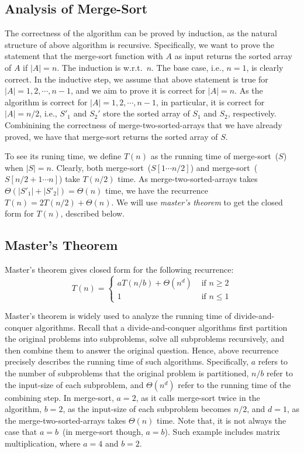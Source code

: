 \subsection*{Analysis of Merge-Sort}

The correctness of the algorithm can be proved by induction, as the natural structure of above algorithm is recursive.
Specifically, we want to prove the statement that the merge-sort function with $A$ as input returns the sorted array of $A$ if $|A| = n$.
The induction is w.r.t.\ $n$. The base case, i.e., $n = 1$, is clearly correct.
In the inductive step, we assume that above statement is true for $|A| = 1, 2, \cdots, n - 1$, and we aim to prove it is correct for $|A| = n$.
As the algorithm is correct for $|A| = 1, 2, \cdots, n - 1$, in particular, it is correct for $|A| = n/2$, i.e.,
$S'_1$ and $S_2'$ store the sorted array of $S_1$ and $S_2$, respectively.
Combinining the correctness of merge-two-sorted-arrays that we have already proved,
we have that merge-sort returns the sorted array of $S$.

To see its runing time, we define $T(n)$ as the running time of merge-sort~($S$) when $|S| = n$.
Clearly, both merge-sort~($S[1\cdots n/2]$) and
merge-sort~($S[n/2+1\cdots n]$) take $T(n/2)$ time.
As merge-two-sorted-arrays takes $\Theta(|S'_1| + |S'_2|) = \Theta(n)$ time, we have the recurrence $T(n) = 2T(n/2) + \Theta(n)$.
We will use \emph{master's theorem} to get the closed form for $T(n)$, described below.

\subsection*{Master's Theorem}

Master's theorem gives closed form for the following recurrence:
\begin{displaymath}
T(n) = \left\{
\begin{array}{llll}
aT(n/b) + \Theta(n^d)  & \textrm{ if } n \ge 2 \\
1  & \textrm{ if } n \le 1 
\end{array}
\right.
\end{displaymath}

Master's theorem is widely used to analyze the running time of divide-and-conquer algorithms. 
Recall that a divide-and-conquer algorithms
first partition the original problems into subproblems, solve all subproblems recursively,
and then combine them to answer the original question.
Hence, above recurrence precisely describes the running time of such algorithms.
Specifically, $a$ refers to the number of subproblems that the original problem is partitioned,
$n/b$ refer to the input-size of each subproblem,
and $\Theta(n^d)$ refer to the running time of the combining step.
In merge-sort, $a = 2$, as it calls merge-sort twice in the algorithm,
$b = 2$, as the input-size of each subproblem becomes $n/2$,
and $d = 1$, as the merge-two-sorted-arrays takes $\Theta(n)$ time.
Note that, it is not always the case that $a = b$~(in merge-sort though, $a = b$).
Such example includes matrix multiplication, where $a = 4$ and $b = 2$.


